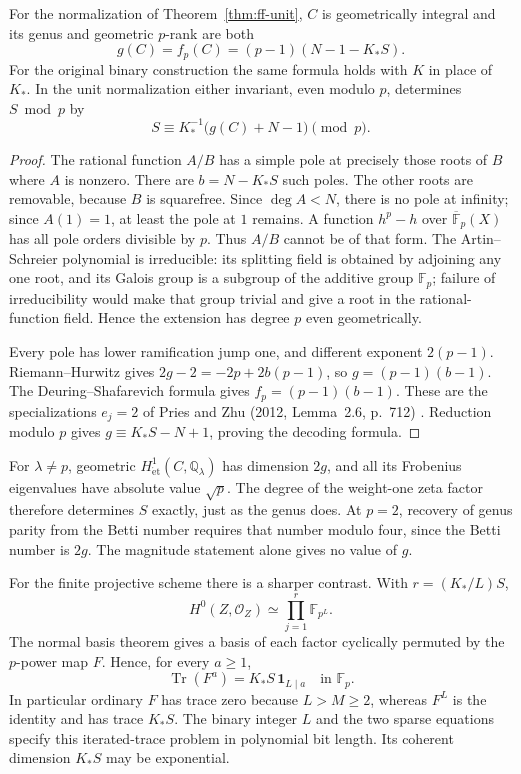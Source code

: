 \begin{theorem}\label{thm:ff-genus}
For the normalization of Theorem~\ref{thm:ff-unit}, $C$ is geometrically integral and its genus and geometric $p$-rank are both
\[
 g(C)=f_p(C)=(p-1)(N-1-K_*S).
\]
For the original binary construction the same formula holds with $K$ in place of $K_*$. In the unit normalization either invariant, even modulo $p$, determines $S\bmod p$ by
\[
 S\equiv K_*^{-1}\bigl(g(C)+N-1\bigr)\pmod p.
\]
\end{theorem}
\begin{proof}
The rational function $A/B$ has a simple pole at precisely those roots of $B$ where $A$ is nonzero. There are $b=N-K_*S$ such poles. The other roots are removable, because $B$ is squarefree. Since $\deg A<N$, there is no pole at infinity; since $A(1)=1$, at least the pole at $1$ remains. A function $h^p-h$ over $\overline{\mathbb F}_p(X)$ has all pole orders divisible by $p$. Thus $A/B$ cannot be of that form. The Artin--Schreier polynomial is irreducible: its splitting field is obtained by adjoining any one root, and its Galois group is a subgroup of the additive group $\mathbb F_p$; failure of irreducibility would make that group trivial and give a root in the rational-function field. Hence the extension has degree $p$ even geometrically.

Every pole has lower ramification jump one, and different exponent $2(p-1)$. Riemann--Hurwitz gives
$2g-2=-2p+2b(p-1)$, so $g=(p-1)(b-1)$. The Deuring--Shafarevich formula gives $f_p=(p-1)(b-1)$. These are the specializations $e_j=2$ of Pries and Zhu (2012, Lemma~2.6, p.~712) \cite{ff-pries-zhu}. Reduction modulo $p$ gives $g\equiv K_*S-N+1$, proving the decoding formula.
\end{proof}

For $\lambda\neq p$, geometric $H^1_{\mathrm{\acute et}}(C,\mathbb Q_\lambda)$ has dimension $2g$, and all its Frobenius eigenvalues have absolute value $\sqrt p$. The degree of the weight-one zeta factor therefore determines $S$ exactly, just as the genus does. At $p=2$, recovery of genus parity from the Betti number requires that number modulo four, since the Betti number is $2g$. The magnitude statement alone gives no value of $g$.

For the finite projective scheme there is a sharper contrast. With $r=(K_*/L)S$,
\[
 H^0(Z,\mathcal O_Z)\simeq\prod_{j=1}^r\mathbb F_{p^L}.
\]
The normal basis theorem gives a basis of each factor cyclically permuted by the $p$-power map $F$. Hence, for every $a\geq1$,
\begin{equation}\label{eq:ff-trace}
 \operatorname{Tr}(F^a)=K_*S\,\mathbf 1_{L\mid a}\quad\text{in }\mathbb F_p.
\end{equation}
In particular ordinary $F$ has trace zero because $L>M\geq2$, whereas $F^L$ is the identity and has trace $K_*S$. The binary integer $L$ and the two sparse equations specify this iterated-trace problem in polynomial bit length. Its coherent dimension $K_*S$ may be exponential.

